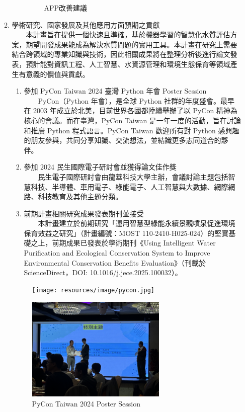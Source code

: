 \documentclass[12pt,a4paper]{article}
\begin{document}
\begin{enumerate}
\begin{enumerate}[label=\arabic*.]
\begin{enumerate}[label=3-2-\arabic*.]
\begin{figure}[H]
\begin{minipage}{0.3\textwidth}
                    \caption{APP改善建議}
                \end{minipage}
            \end{figure}
    \end{enumerate}
\item 學術研究、國家發展及其他應用方面預期之貢獻\\
　　本計畫旨在提供一個快速且準確，基於機器學習的智慧化水質評估方案，期望開發成果能成為解決水質問題的實用工具。本計畫在研究上需要結合跨領域的專業知識與技術，因此相關成果將在整理分析後進行論文發表，預計能對資訊工程、人工智慧、水資源管理和環境生態保育等領域產生有意義的價值與貢獻。
    \begin{enumerate}[label=3-3-\arabic*.]
        \item 參加 PyCon Taiwan 2024 臺灣 Python 年會 Poster Session\\
            　　PyCon（Python 年會），是全球 Python 社群的年度盛會。最早在 2003 年成立於北美，目前世界各國都陸續舉辦了以 PyCon 精神為核心的會議。而在臺灣，PyCon Taiwan 是一年一度的活動，旨在討論和推廣 Python 程式語言。PyCon Taiwan 歡迎所有對 Python 感興趣的朋友參與，共同分享知識、交流想法，並結識更多志同道合的夥伴。
        \item 參加 2024 民生國際電子研討會並獲得論文佳作獎\\
            　　民生電子國際研討會由龍華科技大學主辦，會議討論主題包括智慧科技、半導體、車用電子、綠能電子、人工智慧與大數據、網際網路、科技教育及其他主題分類。
        \item 前期計畫相關研究成果發表期刊並接受\\
            　　本計畫建立於前期研究「運用智慧型綠能永續景觀噴泉促進環境保育效益之研究」（計畫編號：MOST 110-2410-H025-024）的堅實基礎之上，前期成果已發表於學術期刊《Using Intelligent Water Purification and Ecological Conservation System to Improve Environmental Conservation Benefits Evaluation》（刊載於 ScienceDirect，DOI: 10.1016/j.jece.2025.100032）。
    \end{enumerate}
    \begin{figure}[H]
        \centering
        \begin{minipage}[t]{0.45\textwidth}
            \centering
                \texttt{[image: resources/image/pycon.jpg]}
                \caption{PyCon Taiwan 2024 Poster Session}
                \label{fig:pycon}
            \end{minipage}%
            \hfill
            \begin{minipage}[t]{0.45\textwidth}
                \centering
                \includegraphics[height=5cm]{resources/image/民生國際電子研討會.jpg}

\end{minipage}
\end{figure}
\end{enumerate}
\end{enumerate}
\end{document}
